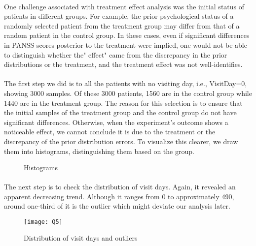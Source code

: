 \documentclass{article}
\begin{document}
\paragraph{}One challenge associated with treatment effect analysis was the initial status of patients in different groups. For example, the prior psychological status of a randomly selected patient from the treatment group may differ from that of a random patient in the control group. In these cases, even if significant differences in PANSS scores posterior to the treatment were implied, one would not be able to distinguish whether the" effect" came from the discrepancy in the prior distributions or the treatment, and the treatment effect was not well-identifies. 
	
		
	\paragraph{}The first step we did is to all the patients with no visiting day, i.e., VisitDay=0, showing 3000 samples. Of these 3000 patients, 1560 are in the control group while 1440 are in the treatment group. The reason for this selection is to ensure that the initial samples of the treatment group and the control group do not have significant differences. Otherwise, when the experiment's outcome shows a noticeable effect, we cannot conclude it is due to the treatment or the discrepancy of the prior distribution errors. To visualize this clearer, we draw them into histograms, distinguishing them based on the group. 


\begin{figure}[H]
\centering
{}
\quad
{}
\quad
{}
\quad
{}
\caption{ Histograms}
\end{figure}


\paragraph{}The next step is to check the distribution of visit days. Again, it revealed an apparent decreasing trend. Although it ranges from 0 to approximately 490, around one-third of it is the outlier which might deviate our analysis later. 
\begin{figure}[H]
		\centering
		\texttt{[image: Q5]}
		\caption{Distribution of visit days and outliers}
	\end{figure}	
\end{document}

